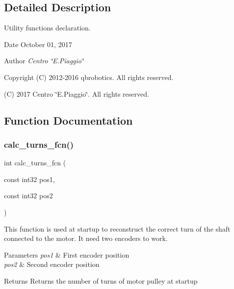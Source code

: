 \subsection{Detailed Description}
Utility functions declaration. 

\begin{DoxyDate}{Date}
October 01, 2017 
\end{DoxyDate}
\begin{DoxyAuthor}{Author}
{\itshape Centro \char`\"{}\+E.\+Piaggio\char`\"{}} 
\end{DoxyAuthor}
\begin{DoxyCopyright}{Copyright}
(C) 2012-\/2016 qbrobotics. All rights reserved. 

(C) 2017 Centro \char`\"{}\+E.\+Piaggio\char`\"{}. All rights reserved. 
\end{DoxyCopyright}


\subsection{Function Documentation}
\mbox{\label{utils_8h_afa68f255d25478e463690f63d529c29d}} 
\subsubsection{calc\+\_\+turns\+\_\+fcn()}
{\footnotesize\ttfamily int calc\+\_\+turns\+\_\+fcn (\begin{DoxyParamCaption}\item[{const int32}]{pos1,  }\item[{const int32}]{pos2 }\end{DoxyParamCaption})}

This function is used at startup to reconstruct the correct turn of the shaft connected to the motor. It need two encoders to work.


\begin{DoxyParams}{Parameters}
{\em pos1} & First encoder position \\
\hline
{\em pos2} & Second encoder position\\
\hline
\end{DoxyParams}
\begin{DoxyReturn}{Returns}
Returns the number of turns of motor pulley at startup 
\end{DoxyReturn}
\mbox{\label{utils_8h_a6d9dc88d64cd1f74a30fd0e404a3bb31}} 
